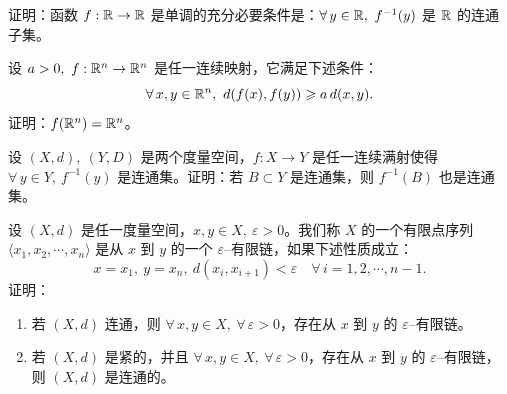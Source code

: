\begin{exercise}
	\item 证明：函数 $f:\mathbb{R}\to\mathbb{R}$ 是单调的充分必要条件是：$\forall\,y\in\R,\ f^{-1}(y)$ 是 $\mathbb{R}$ 的连通子集。
\end{exercise}

\begin{exercise}
	\item 设 $a>0,\ f:\mathbb{R}^n\to\mathbb{R}^n$ 是任一连续映射，它满足下述条件：
	\[\forall\,x,y\in\mathbb{R}^n,\ d(f(x),f(y))\geqslant a\,d(x,y).\]
	证明：$f(\mathbb{R}^n)=\mathbb{R}^n$。
\end{exercise}

\begin{exercise}
	\item 设 $(X,d),\ (Y,D)$ 是两个度量空间，$f:X\to Y$ 是任一连续满射使得 $\forall\,y\in Y,\ f^{-1}(y)$ 是连通集。证明：若 $B\subset Y$ 是连通集，则 $f^{-1}(B)$ 也是连通集。
\end{exercise}

\begin{exercise}
	\item 设 $(X,d)$ 是任一度量空间，$x,y\in X,\ \varepsilon>0$。我们称 $X$ 的一个有限点序列 $\langle x_1,x_2,\cdots,x_n\rangle$ 是从 $x$ 到 $y$ 的一个 $\varepsilon$--有限链，如果下述性质成立：
	\[x=x_1,\ y=x_n,\ d(x_i,x_{i+1})<\varepsilon\quad\forall\,i=1,2,\cdots,n-1.\]
	证明：
	\begin{enumerate}[label=\arabic*)]
		\item 若 $(X,d)$ 连通，则 $\forall\,x,y\in X,\ \forall\,\varepsilon>0$，存在从 $x$ 到 $y$ 的 $\varepsilon$--有限链。
		\item 若 $(X,d)$ 是紧的，并且 $\forall\,x,y\in X,\ \forall\,\varepsilon>0$，存在从 $x$ 到 $y$ 的 $\varepsilon$--有限链，则 $(X,d)$ 是连通的。
	\end{enumerate}
\end{exercise}
